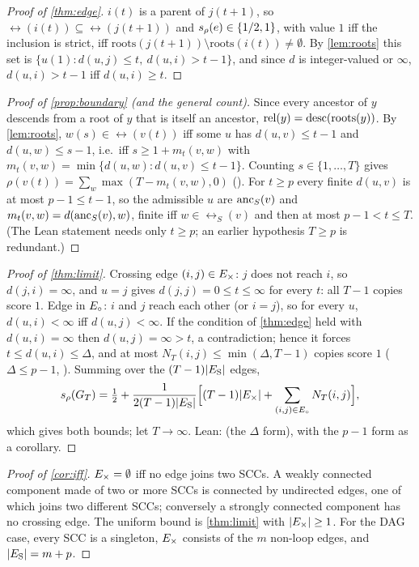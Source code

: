\begin{proof}[Proof of \cref{thm:edge}]
$i(t)$ is a parent of $j(t{+}1)$, so $\rel(i(t))\subseteq\rel(j(t{+}1))$ and
$s_\rho(e)\in\{1/2,1\}$, with value $1$ iff the inclusion is strict, iff
$\mathrm{roots}(j(t{+}1))\setminus\mathrm{roots}(i(t))\neq\emptyset$. By
\cref{lem:roots} this set is $\{u(1):d(u,j)\le t,\ d(u,i)>t-1\}$, and since
$d$ is integer-valued or $\infty$, $d(u,i)>t-1$ iff $d(u,i)\ge t$.
\end{proof}

\begin{proof}[Proof of \cref{prop:boundary} (and the general count)]
Since every ancestor of $y$ descends from a root of $y$ that is itself an
ancestor, $\mathrm{rel}(y)=\mathrm{desc}(\mathrm{roots}(y))$. By \cref{lem:roots},
$w(s)\in\rel(v(t))$ iff some $u$ has $d(u,v)\le t-1$ and $d(u,w)\le s-1$,
i.e.\ iff $s\ge1+m_t(v,w)$ with $m_t(v,w)=\min\{d(u,w):d(u,v)\le t-1\}$.
Counting $s\in\{1,\dots,T\}$ gives
$\rho(v(t))=\sum_{w}\max(T-m_t(v,w),0)$ (). For
$t\ge p$ every finite $d(u,v)$ is at most $p-1\le t-1$, so the admissible $u$
are $\mathrm{anc}_S(v)$ and $m_t(v,w)=d(\mathrm{anc}_S(v),w)$, finite iff $w\in\rel_S(v)$ and
then at most $p-1<t\le T$. (The Lean statement 
needs only $t\ge p$; an earlier hypothesis $T\ge p$ is redundant.)
\end{proof}

\begin{proof}[Proof of \cref{thm:limit}]
Crossing edge $(i,j)\in E_{\times}$: $j$ does not reach $i$, so $d(j,i)=\infty$, and
$u=j$ gives $d(j,j)=0\le t\le\infty$ for every $t$: all $T-1$ copies score
$1$. Edge in $E_{\circ}$: $i$ and $j$ reach each other (or $i=j$), so for every $u$,
$d(u,i)<\infty$ iff $d(u,j)<\infty$. If the condition of \cref{thm:edge} held
with $d(u,i)=\infty$ then $d(u,j)=\infty>t$, a contradiction; hence it forces
$t\le d(u,i)\le\Delta$, and at most $N_T(i,j)\le\min(\Delta,T-1)$ copies score
$1$ ($\Delta\le p-1$, ). Summing over the $(T-1)|E_{\mathrm S}|$ edges,
\[
s_\rho(G_T)=\tfrac12+\frac{1}{2(T-1)|E_{\mathrm S}|}\Big[(T-1)|E_{\times}|+\sum_{(i,j)\in E_{\circ}}N_T(i,j)\Big],
\]
which gives both bounds; let $T\to\infty$. Lean: 
(the $\Delta$ form), with the $p-1$ form  as a corollary.
\end{proof}

\begin{proof}[Proof of \cref{cor:iff}]
$E_{\times}=\emptyset$ iff no edge joins two SCCs. A weakly connected component made of
two or more SCCs is connected by undirected edges, one of which joins two
different SCCs; conversely a strongly connected component has no crossing
edge. The uniform bound is \cref{thm:limit} with $|E_{\times}|\ge1$. For the DAG case,
every SCC is a singleton, $E_{\times}$ consists of the $m$ non-loop edges, and
$|E_{\mathrm S}|=m+p$.
\end{proof}

